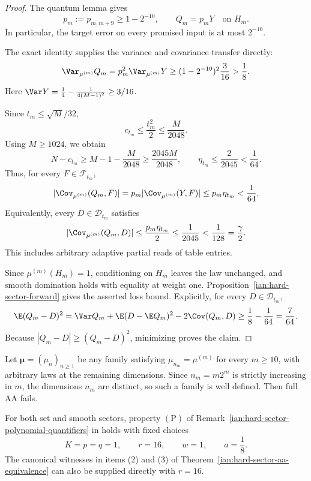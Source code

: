 \begin{proof}
The quantum lemma gives
\[
 p_m:=p_{m,m+9}\ge1-2^{-10},
 \qquad
 Q_m=p_mY\quad\text{on }H_m.
\]
In particular, the target error on every promised input is at most \(2^{-10}\).

The exact identity supplies the variance and covariance transfer directly:
\[
 \Var_{\mu^{(m)}}Q_m
 =p_m^2\Var_{\mu^{(m)}}Y
 \ge(1-2^{-10})^2\frac3{16}
 >\frac18.
\]
Here
\(\Var Y=\frac14-\frac1{4(M-1)^2}\ge3/16\).

Since \(t_m\le\sqrt M/32\),
\[
 c_{t_m}\le\frac{t_m^2}{2}\le\frac M{2048}.
\]
Using \(M\ge1024\), we obtain
\[
 N-c_{t_m}
 \ge M-1-\frac M{2048}
 \ge\frac{2045M}{2048},
 \qquad
 \eta_{t_m}\le\frac2{2045}<\frac1{64}.
\]
Thus, for every \(F\in\mathcal F_{t_m}\),
\[
 |\Cov_{\mu^{(m)}}(Q_m,F)|
 =p_m|\Cov_{\mu^{(m)}}(Y,F)|
 \le p_m\eta_{t_m}
 <\frac1{64}.
\]
Equivalently, every \(D\in\mathcal D_{t_m}\) satisfies
\[
 |\Cov_{\mu^{(m)}}(Q_m,D)|
 \le\frac{p_m\eta_{t_m}}2
 \le\frac1{2045}
 <\frac1{128}=\frac\gamma2.
\]
This includes arbitrary adaptive partial reads of table entries.

Since \(\mu^{(m)}(H_m)=1\), conditioning on \(H_m\) leaves the law unchanged, and smooth domination holds with equality at weight one. Proposition~\ref{ian:hard-sector-forward} gives the asserted loss bound. Explicitly, for every \(D\in\mathcal D_{t_m}\),
\[
 \E(Q_m-D)^2
 =\Var Q_m+\E(D-\E Q_m)^2-2\Cov(Q_m,D)
 \ge\frac18-\frac1{64}=\frac7{64}.
\]
Because \(|Q_m-D|\ge(Q_m-D)^2\), minimizing proves the claim.
\end{proof}

\begin{corollary}\label{ian:simon-full-aa-failure}
Let \(\symbf{\mu}=(\mu_n)_{n\ge1}\) be any family satisfying
\(\mu_{n_m}=\mu^{(m)}\) for every \(m\ge10\), with arbitrary laws at the remaining dimensions. Since \(n_m=m2^m\) is strictly increasing in \(m\), the dimensions \(n_m\) are distinct, so such a family is well defined. Then full AA fails.

For both set and smooth sectors, property \(\mathrm{(P)}\) of
Remark~\ref{ian:hard-sector-polynomial-quantifiers} in
holds with fixed choices
\[
 K=p=q=1,\qquad r=16,\qquad w=1,\qquad a=\frac18.
\]
The canonical witnesses in items (2) and (3) of
Theorem~\ref{ian:hard-sector-aa-equivalence} can also be supplied directly with \(r=16\).
\end{corollary}

